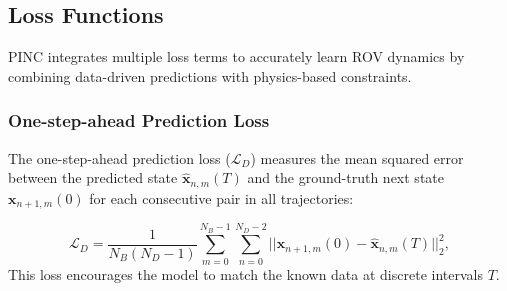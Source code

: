 \documentclass[conference]{IEEEtran}
\begin{document}
\subsection{Loss Functions}
\label{sec:loss_funcs}
PINC integrates multiple loss terms to accurately learn ROV dynamics by combining data-driven predictions with physics-based constraints. 

\subsubsection{One-step-ahead Prediction Loss}
The one-step-ahead prediction loss ($\mathcal{L}_D$) measures the mean squared error between the predicted state $\hat{\mathbf{x}}_{n,m}(T)$ and the ground-truth next state $\mathbf{x}_{n+1,m}(0)$ for each consecutive pair in all trajectories:

\begin{equation}
    \mathcal{L}_D = \frac{1}{N_B(N_D-1)} \sum^{N_B-1}_{m=0} \sum^{N_D-2}_{n=0} ||\mathbf{x}_{n+1,m}(0)-\hat{\mathbf{x}}_{n,m}(T)||_2^2,
\end{equation}
This loss encourages the model to match the known data at discrete intervals $T$.
\end{document}
